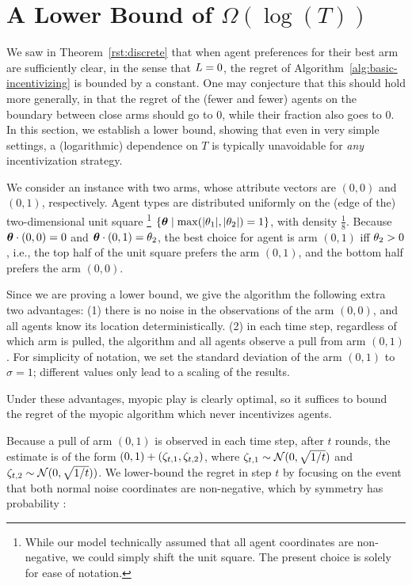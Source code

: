 \section{A Lower Bound of $\Omega(\log(T))$} \label{sec:lb}

We saw in Theorem~\ref{rst:discrete} that 
when agent preferences for their best arm are sufficiently clear,
in the sense that $L = 0$, the regret of
Algorithm~\ref{alg:basic-incentivizing} is bounded by a constant.
One may conjecture that this should hold more generally,
in that the regret of the (fewer and fewer) agents on the boundary
between close arms should go to 0, while their fraction also goes to 0.
In this section, we establish a lower bound,
showing that even in very simple settings, a (logarithmic) dependence
on $T$ is typically unavoidable for \emph{any} incentivization strategy.

We consider an instance with two arms,
whose attribute vectors are $(0,0)$ and $(0,1)$, respectively.
Agent types are distributed uniformly on the (edge of the)
two-dimensional unit square%
\footnote{While our model technically assumed that all agent coordinates are
non-negative, we could simply shift the unit square.
The present choice is solely for ease of notation.}  
$\{ \bm{\theta} \mid \max(|\theta_{1}|, |\theta_{2}|) = 1 \}$,
with density $\frac{1}{8}$.
Because $\bm{\theta} \cdot (0,0) = 0$ and $\bm{\theta} \cdot (0,1) = \theta_{2}$,
the best choice for agent \AgV is arm $(0,1)$ iff $\theta_{2} > 0$,
i.e., the top half of the unit square prefers the arm $(0,1)$,
and the bottom half prefers the arm $(0,0)$.

Since we are proving a lower bound, we give the algorithm the
following extra two advantages:
(1) there is no noise in the observations of the arm $(0,0)$,
and all agents know its location deterministically.
(2) in each time step, regardless of which arm is pulled, the algorithm
and all agents observe a pull from arm $(0,1)$.
For simplicity of notation, we set the standard deviation of the arm
$(0,1)$ to $\sigma = 1$;
different values only lead to a scaling of the results.

Under these advantages, myopic play is clearly optimal, so it suffices
to bound the regret of the myopic algorithm which never incentivizes
agents. 

Because a pull of arm $(0,1)$ is observed in each time step,
after $t$ rounds, the estimate  is of the form
$(0,1) + (\Noise[t]{1}, \Noise[t]{2})$,
where $\Noise[t]{1} \sim \Normal{0}{\sqrt{1/t}}$
and $\Noise[t]{2} \sim \Normal{0}{\sqrt{1/t}})$.
We lower-bound the regret in step $t$ by focusing on the event that
both normal noise coordinates are non-negative,
which by symmetry has probability \quarter:

